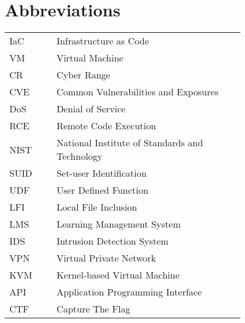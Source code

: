 \chapter*{Abbreviations}

\begin{flushleft}
\begin{tabular}{l p{0.8\linewidth}}
IaC      & Infrastructure as Code\\
VM       & Virtual Machine\\
CR       & Cyber Range\\
CVE      & Common Vulnerabilities and Exposures\\
DoS      & Denial of Service\\
RCE      & Remote Code Execution\\
NIST     & National Institute of Standards and Technology\\
SUID     & Set-user Identification\\
UDF      & User Defined Function\\
LFI      & Local File Inclusion\\
LMS      & Learning Management System\\
IDS      & Intrusion Detection System\\
VPN      & Virtual Private Network\\
KVM      & Kernel-based Virtual Machine\\
API      & Application Programming Interface\\
CTF      & Capture The Flag\\
\end{tabular}
\end{flushleft}

